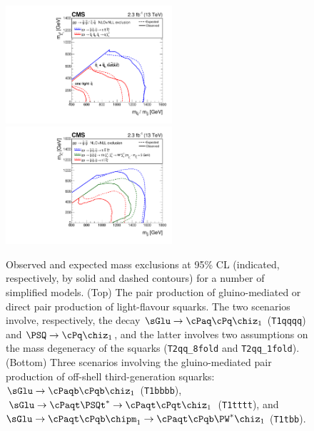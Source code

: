 \begin{figure}[h!]
  \begin{center}
    \includegraphics[width=0.55\textwidth]{figures/limits/v2/mixSUMMARY.pdf}
    \includegraphics[width=0.55\textwidth]{figures/limits/v2/gluinoSUMMARY.pdf} 
    \caption{Observed and expected mass exclusions at 95\% CL
      (indicated, respectively, by solid and dashed contours) for
      a number of simplified models. (Top) The pair production of
      gluino-mediated or direct pair production of light-flavour
      squarks. The two scenarios involve, respectively, the
      decay $\sGlu\ra\cPaq\cPq\chiz_1$ (\texttt{T1qqqq}) and
      $\PSQ\ra\cPq\chiz_1$, and the latter involves two assumptions on
      the mass degeneracy of the squarks (\texttt{T2qq\_8fold} and
      \texttt{T2qq\_1fold}). (Bottom) Three scenarios involving the
      gluino-mediated pair production of off-shell third-generation
      squarks: $\sGlu\ra\cPaqb\cPqb\chiz_1$ (\texttt{T1bbbb}),
      $\sGlu\ra\cPaqt\PSQt^*\ra\cPaqt\cPqt\chiz_1$ (\texttt{T1tttt}),
      and $\sGlu\ra\cPaqt\cPqb\chipm_1\ra\cPaqt\cPqb\PW^*\chiz_1$
      (\texttt{T1tbb}). 
}
    \label{fig:limits-sms-1} 
    \vspace{2.0cm} %
  \end{center}
\end{figure}

